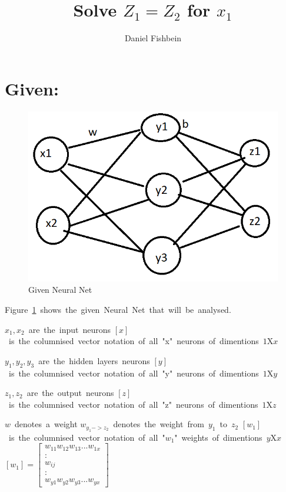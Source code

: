 \documentclass{article}
\title{Solve $Z_1 = Z_2$ for $x_1$}
\author{Daniel Fishbein}
\begin{document}
\maketitle

\section{Given:}

\begin{figure}[h!]{
    \centering
    \includegraphics[width=0.5\linewidth]{Given_NN.png}
    \caption{Given Neural Net}\label{fig:NeuralNet}
    }
\end{figure}

\hbox{Figure~\ref{fig:NeuralNet} shows the given Neural Net that will be analysed.}

\vspace{5mm}

\hbox{$x_1, x_2$ are the input neurons}
\hbox{$[x]$ is the columnised vector notation of all "x" neurons of dimentions $1$X$x$}
\vspace{1mm}

\hbox{$y_1, y_2, y_3$ are the hidden layers neurons}
\hbox{$[y]$ is the columnised vector notation of all "y" neurons of dimentions $1$X$y$}
\vspace{1mm}

\hbox{$z_1, z_2$ are the output neurons}
\hbox{$[z]$ is the columnised vector notation of all "z" neurons of dimentions $1$X$z$}

\vspace{2mm}
\hbox{$w$ denotes a weight}
\hbox{$w_{y_1->z_2}$ denotes the weight from $y_1$ to $z_2$}
\hbox{$[w_1]$ is the columnised vector notation of all "$w_1$" weights of dimentions $y$X$x$}
\hbox{$[w_1] = [
    \begin{matrix}
        w_{11} w_{12} w_{13} ... w_{1x} \\
        :\\
        w_{ij}\\
        :\\
        w_{y1} w_{y2} w_{y3} ... w_{yx}
    \end{matrix}
]$}
\end{document}
